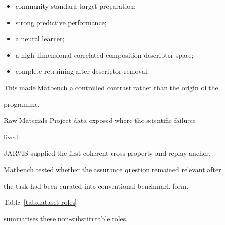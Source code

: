 \documentclass[11pt,a4paper,oneside]{report}
\begin{document}
\begin{itemize}



\item

community-standard target preparation;



\item

strong predictive performance;



\item

a neural learner;



\item

a high-dimensional correlated composition descriptor space;



\item

complete retraining after descriptor removal.



\end{itemize}



This made Matbench a controlled contrast rather than the origin of the

programme.



Raw Materials Project data exposed where the scientific failures

lived.



JARVIS supplied the first coherent cross-property and replay anchor.



Matbench tested whether the assurance question remained relevant after

the task had been curated into conventional benchmark form.



Table~\ref{tab:dataset-roles}

summarises these non-substitutable roles.
\end{document}
